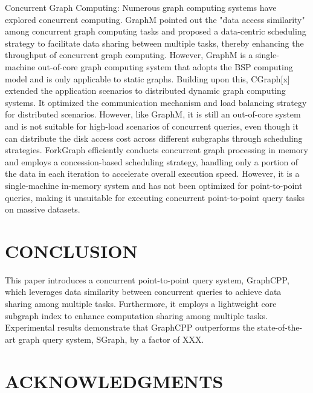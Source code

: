 \documentclass[lettersize,journal]{IEEEtran} %
\begin{document}
Concurrent Graph Computing: Numerous graph computing systems have explored concurrent computing. GraphM pointed out the "data access similarity" among concurrent graph computing tasks and proposed a data-centric scheduling strategy to facilitate data sharing between multiple tasks, thereby enhancing the throughput of concurrent graph computing. However, GraphM is a single-machine out-of-core graph computing system that adopts the BSP computing model and is only applicable to static graphs. Building upon this, CGraph[x] extended the application scenarios to distributed dynamic graph computing systems. It optimized the communication mechanism and load balancing strategy for distributed scenarios. However, like GraphM, it is still an out-of-core system and is not suitable for high-load scenarios of concurrent queries, even though it can distribute the disk access cost across different subgraphs through scheduling strategies. ForkGraph efficiently conducts concurrent graph processing in memory and employs a concession-based scheduling strategy, handling only a portion of the data in each iteration to accelerate overall execution speed. However, it is a single-machine in-memory system and has not been optimized for point-to-point queries, making it unsuitable for executing concurrent point-to-point query tasks on massive datasets.

\section{CONCLUSION}
This paper introduces a concurrent point-to-point query system, GraphCPP, which leverages data similarity between concurrent queries to achieve data sharing among multiple tasks. Furthermore, it employs a lightweight core subgraph index to enhance computation sharing among multiple tasks. Experimental results demonstrate that GraphCPP outperforms the state-of-the-art graph query system, SGraph, by a factor of XXX.

\section{ACKNOWLEDGMENTS}
\end{document}
